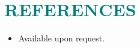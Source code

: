 \documentclass[a4paper, 11pt]{article}
\begin{document}
	
\section{\textcolor{teal}{\bf{REFERENCES}}}

	\vspace{3pt}
	
	\begin{itemize}[leftmargin=*, itemsep=-1mm]
		
		\item Available upon request.
		
	\end{itemize}
	
	
			
\end{document}
